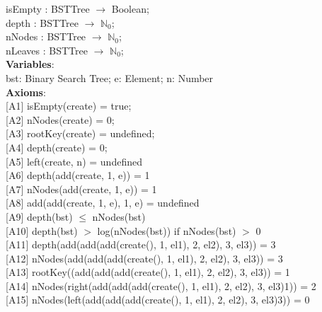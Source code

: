 \documentclass[12pt]{article}
\begin{document}
\begin{spacing}{1.5}
\hspace*{5mm} isEmpty : BSTTree $\rightarrow$ Boolean;\\
\hspace*{5mm} depth : BSTTree $\rightarrow$ $\mathbb{N}_0$;\\
\hspace*{5mm} nNodes : BSTTree $\rightarrow$ $\mathbb{N}_0$;\\
\hspace*{5mm} nLeaves : BSTTree $\rightarrow$ $\mathbb{N}_0$;\\
\noindent \textbf{Variables}:\\
\hspace*{5mm} bst: Binary Search Tree; e: Element; n: Number\\
\noindent \textbf{Axioms}:\\
\hspace*{5mm} [A1] isEmpty(create) = true;\\
\hspace*{5mm} [A2] nNodes(create) = 0;\\
\hspace*{5mm} [A3] rootKey(create) = undefined;\\
\hspace*{5mm} [A4] depth(create) = 0;\\
\hspace*{5mm} [A5] left(create, n) = undefined\\
\hspace*{5mm} [A6] depth(add(create, 1, e)) = 1\\
\hspace*{5mm} [A7] nNodes(add(create, 1, e)) = 1\\
\hspace*{5mm} [A8] add(add(create, 1, e), 1, e) = undefined\\
\hspace*{5mm} [A9] depth(bst) $\leq$ nNodes(bst)\\
\hspace*{5mm} [A10] depth(bst)  $>$ log(nNodes(bst))  if nNodes(bst)  $>$ 0  \\ 
\hspace*{5mm} [A11] depth(add(add(add(create(), 1, el1), 2, el2), 3, el3)) = 3\\
\hspace*{5mm} [A12] nNodes(add(add(add(create(), 1, el1), 2, el2), 3, el3)) = 3\\
\hspace*{5mm} [A13] rootKey((add(add(add(create(), 1, el1), 2, el2), 3, el3)) = 1\\
\hspace*{5mm} [A14] nNodes(right(add(add(add(create(), 1, el1), 2, el2), 3, el3)1)) = 2\\
\hspace*{5mm} [A15] nNodes(left(add(add(add(create(), 1, el1), 2, el2), 3, el3)3)) = 0\\

\end{spacing}
\end{document}
